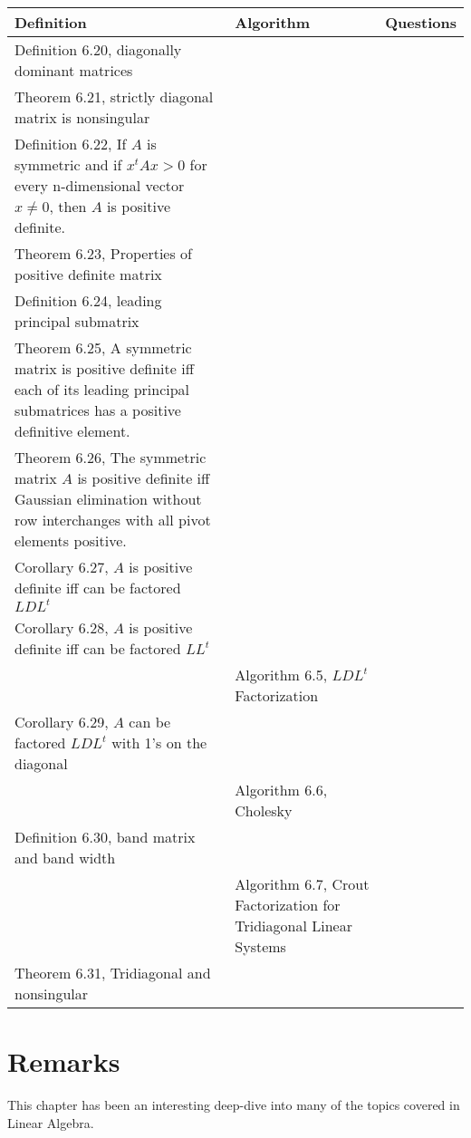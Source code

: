 \documentclass{article}
\begin{document}
\begin{tabularx}{\textwidth}{ |X|X|c| }
    \hline
	{\bf Definition} & {\bf Algorithm} & {\bf Questions} \\
    \hline
	Definition 6.20, diagonally dominant matrices & & \\
    \hline
	Theorem 6.21, strictly diagonal matrix is nonsingular & & \\
    \hline
	Definition 6.22, If $A$ is symmetric and if $x^tAx>0$ for every n-dimensional vector $x \ne 0$, then $A$ is positive definite. & & \\
    \hline
	Theorem 6.23, Properties of positive definite matrix & & \\
    \hline
	Definition 6.24, leading principal submatrix & & \\
    \hline
	Theorem 6.25, A symmetric matrix is positive definite iff each of its leading principal submatrices has a positive definitive element. & & \\
    \hline
	Theorem 6.26, The symmetric matrix $A$ is positive definite iff Gaussian elimination without row interchanges with all pivot elements positive. & & \\
    \hline
	Corollary 6.27, $A$ is positive definite iff can be factored $LDL^t$ & & \\
    \hline
	Corollary 6.28, $A$ is positive definite iff can be factored $LL^t$ & & \\
    \hline
	 & Algorithm 6.5, $LDL^t$ Factorization & \\
    \hline
	Corollary 6.29, $A$ can be factored $LDL^t$ with 1's on the diagonal & & \\
    \hline
	 & Algorithm 6.6, Cholesky & \\
    \hline
	Definition 6.30, band matrix and band width & & \\
    \hline
	 & Algorithm 6.7, Crout Factorization for Tridiagonal Linear Systems & \\
    \hline
	Theorem 6.31, Tridiagonal and nonsingular & & \\
    \hline
\end{tabularx}


\section*{Remarks}

This chapter has been an interesting deep-dive into many of the topics covered in Linear Algebra.
\end{document}
